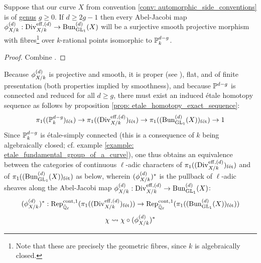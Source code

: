             \begin{proposition} \label{prop: the_unramified_abel_jacobi_map_is_a_projective_bundle}
                \cite[Theorem 25.1(3)]{bhatt_abelian_varieties} Suppose that our curve $X$ from convention \ref{conv: automorphic_side_conventions} is of \href{https://stacks.math.columbia.edu/tag/0BY6}{\underline{genus}} $g \geq 0$. If $d \geq 2g - 1$ then every Abel-Jacobi map $\AJ_{X/k}^{(d)}: \Div_{X/k}^{\eff, (d)} \to \Bun_{\GL_1}^{(d)}(X)$ will be a surjective smooth projective morphism with fibres\footnote{Note that these are precisely the geometric fibres, since $k$ is algebraically closed.} over $k$-rational points isomorphic to $\P^{d - g}_k$.
            \end{proposition}
                \begin{proof}
                    Combine \cite[Theorem 5.1 and Remark 5.6(c)]{milne_abelian_varieties}.
                \end{proof}
            \begin{corollary} \label{coro: unramified_galois_representations_induced_by_the_abel_jacobi_map}
                Because $\AJ_{X/k}^{(d)}$ is projective and smooth, it is proper (see \cite[\href{https://stacks.math.columbia.edu/tag/01WC}{Tag 01WC}]{stacks}), flat, and of finite presentation (both properties implied by smoothness), and because $\P^{d - g}$ is connected and reduced for all $d \geq g$, there must exist an induced \'etale homotopy sequence as follows by proposition \ref{prop: etale_homotopy_exact_sequence}:
                    $$\pi_1((\P^{d - g}_k)_{\fet}) \to \pi_1((\Div_{X/k}^{\eff, (d)})_{\fet}) \to \pi_1((\Bun_{\GL_1}^{(d)}(X))_{\fet}) \to 1$$
                Since $\P^{d - g}_k$ is \'etale-simply connected (this is a consequence of $k$ being algebraically closed; cf. example \ref{example: etale_fundamental_group_of_a_curve}), one thus obtains an equivalence between the categories of continuous $\ell$-adic characters of $\pi_1((\Div_{X/k}^{\eff, (d)})_{\fet})$ and of $\pi_1((\Bun_{\GL_1}^{(d)}(X))_{\fet})$ as below, wherein $(\AJ_{X/k}^{(d)})^*$ is the pullback of $\ell$-adic sheaves along the Abel-Jacobi map $\AJ_{X/k}^{(d)}: \Div_{X/k}^{\eff, (d)} \to \Bun_{\GL_1}^{(d)}(X)$:
                    $$(\AJ_{X/k}^{(d)})^*: \Rep^{\cont, 1}_{\bar{\Q}_{\ell}}(\pi_1((\Div_{X/k}^{\eff, (d)})_{\fet})) \to \Rep^{\cont, 1}_{\bar{\Q}_{\ell}}(\pi_1((\Bun_{\GL_1}^{(d)}(X))_{\fet}))$$
                    $$\chi \mapsto \chi \circ (\AJ_{X/k}^{(d)})^*$$
            \end{corollary}
    
